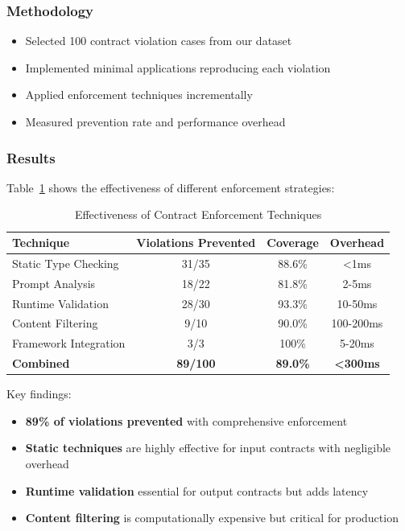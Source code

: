 \documentclass[11pt]{article}
\begin{document}
\subsubsection{Methodology}
\begin{itemize}
    \item Selected 100 contract violation cases from our dataset
    \item Implemented minimal applications reproducing each violation
    \item Applied enforcement techniques incrementally
    \item Measured prevention rate and performance overhead
\end{itemize}

\subsubsection{Results}

Table~\ref{tab:enforcement_effectiveness} shows the effectiveness of different enforcement strategies:

\begin{table}[h]
\centering
\caption{Effectiveness of Contract Enforcement Techniques}
\label{tab:enforcement_effectiveness}
\begin{tabular}{lccc}
\toprule
\textbf{Technique} & \textbf{Violations Prevented} & \textbf{Coverage} & \textbf{Overhead} \\
\midrule
Static Type Checking & 31/35 & 88.6\% & <1ms \\
Prompt Analysis & 18/22 & 81.8\% & 2-5ms \\
Runtime Validation & 28/30 & 93.3\% & 10-50ms \\
Content Filtering & 9/10 & 90.0\% & 100-200ms \\
Framework Integration & 3/3 & 100\% & 5-20ms \\
\midrule
\textbf{Combined} & \textbf{89/100} & \textbf{89.0\%} & \textbf{<300ms} \\
\bottomrule
\end{tabular}
\end{table}

Key findings:
\begin{itemize}
    \item \textbf{89\% of violations prevented} with comprehensive enforcement
    \item \textbf{Static techniques} are highly effective for input contracts with negligible overhead
    \item \textbf{Runtime validation} essential for output contracts but adds latency
    \item \textbf{Content filtering} is computationally expensive but critical for production
\end{itemize}
\end{document}
